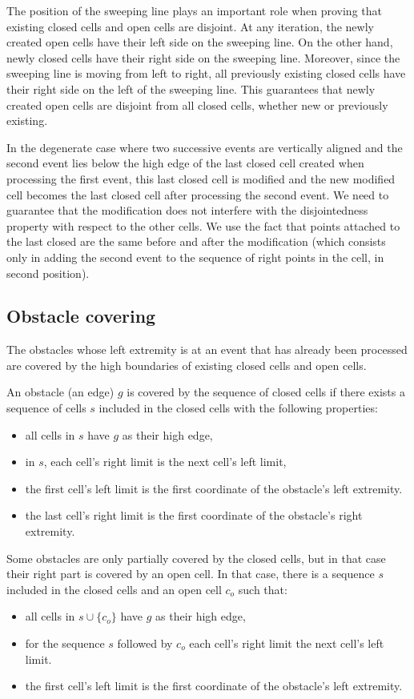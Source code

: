 \documentclass[a4paper, USenglish, cleveref, autoref, thm-restate, final]{lipics-v2021}
\begin{document}
The position of the sweeping line plays an important role when proving
that existing closed cells and open cells are disjoint.  At any
iteration, the newly created open cells have their left side on the
sweeping line.  On the other hand, newly closed cells have their right
side on the sweeping line.  Moreover, since the sweeping line is moving
from left to right, all previously existing closed cells have their
right side on the left of the sweeping line.  This guarantees that newly
created open cells are disjoint from all closed cells, whether new or
previously existing.

In the degenerate case where two successive events are vertically
aligned and the second event lies below the high edge of the last
closed cell created when processing the first event, this last closed
cell is modified and the new modified cell becomes the last closed
cell after processing the second event.  We need to guarantee that
the modification does not interfere with the disjointedness property with
respect to the other cells.  We use the fact that
points attached to the last closed are the same before and after the
modification (which consists only in adding the second event to the
sequence of right points in the cell, in second position).
\subsection{Obstacle covering}
The obstacles whose left extremity is at an event that has already been
processed are covered by the high boundaries of existing closed cells and
open cells.

An obstacle (an edge) \(g\) is covered by the sequence of closed cells if
there exists a sequence of cells \(s\) included in the closed cells
with the following properties:
\begin{itemize}
\item all cells in \(s\) have \(g\) as their high edge,
\item in \(s\), each cell's right limit is the next cell's left limit,
\item the first cell's left limit is the first coordinate of the obstacle's
  left extremity.
\item the last cell's right limit is the first coordinate of the obstacle's
  right extremity.
\end{itemize}
Some obstacles are only partially covered by the closed cells, but in that
case their right part is covered by an open cell.  In that case, there
is a sequence \(s\) included in the closed cells
and an open cell \(c_o\) such that:
\begin{itemize}
\item all cells in \(s \cup \{c_o\}\) have \(g\) as their high edge,
\item for the sequence \(s\) followed by \(c_o\) each cell's right limit
  the next cell's left limit.
\item the first cell's left limit is the first coordinate of the obstacle's
  left extremity.
\end{itemize}
\end{document}
